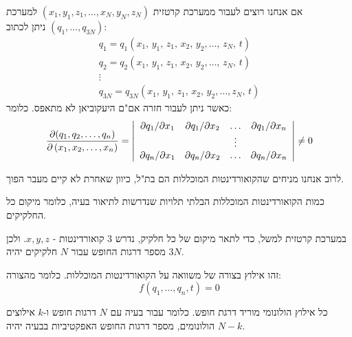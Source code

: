 \documentclass{tstextbook}
\begin{document}
\begin{theorem}
אם אנחנו רוצים לעבור ממערכת קרטזית \(\left( x_{1},y_{1},z_{1},\dots,x_{N},y_{N},z_{N} \right)\) למערכת \(\left( q_{1},\dots,q_{3N} \right)\) ניתן לכתוב:
$$\begin{array}{c}{{q_{1}=q_{1}\left( x_{1},\,y_{1},\,z_{1},\,x_{2},\,y_{2},\dots,\,z_{N},\,t \right)}}\\ {{q_{2}=q_{2}\left( x_{1},\,y_{1},\,z_{1},\,x_{2},\,y_{2},\dots,\,z_{N},\,t \right)}}\\ {{\vdots}}\\ {{q_{3N}=q_{3N}\left( x_{1},\,y_{1},\,z_{1},\,x_{2},\,y_{2},\dots,z_{N},\,t \right)}}\end{array}$$
כאשר ניתן לעבור חזרה אם"ם היעקוביאן לא מתאפס. כלומר:
$$\frac{\partial(q_{1},q_{2},\ldots,q_{n})}{\partial\left(x_{1},x_{2},\ldots,x_{n}\right)}=\left|\begin{array}{c c c c}{{\partial q_{1}/\partial x_{1}}}&{{\partial q_{1}/\partial x_{2}}}&{{\ldots}}&{{\partial q_{1}/\partial x_{n}}}\\ {{}}&{{}}&{{\vdots}}&{{}}\\ {{\partial q_{n}/\partial x_{1}}}&{{\partial q_{n}/\partial x_{2}}}&{{\ldots}}&{{\partial q_{n}/\partial x_{n}}}\end{array}\right|\neq0$$

\end{theorem}
\begin{remark}
לרוב אנחנו מניחים שהקואורדינטות המוכללות הם בת"ל, כיוון שאחרת לא קיים מעבר הפוך.

\end{remark}
\begin{corollary}
\end{corollary}
\begin{definition}
כמות הקואורדינטות המוכללות הבלתי תלויות שנדרשות לתיאור בעיה, כלומר מיקום כל החלקיקים.

\end{definition}
במערכת קרטזית למשל, כדי לתאר מיקום של כל חלקיק, נדרש 3 קואורדינטות - \(x,y,z\). ולכן מספר דרגות החופש עבור \(N\) חלקיקים יהיה \(3N\).

\begin{definition}
זהו אילוץ בצורה של משוואה על הקואורדינטות המוכללות. כלומר מהצורה:
$$f\left( q_{1},\dots,q_{n},t \right)=0$$

\end{definition}
\begin{theorem}
כל אילוץ הולונומי מוריד דרגת חופש. כלומר עבור בעיה עם \(N\) דרגות חופש ו-\(k\) אילוצים הולונומים, מספר דרגות החופש האפקטיביות בבעיה יהיה \(N-k\).

\end{theorem}
\end{document}
